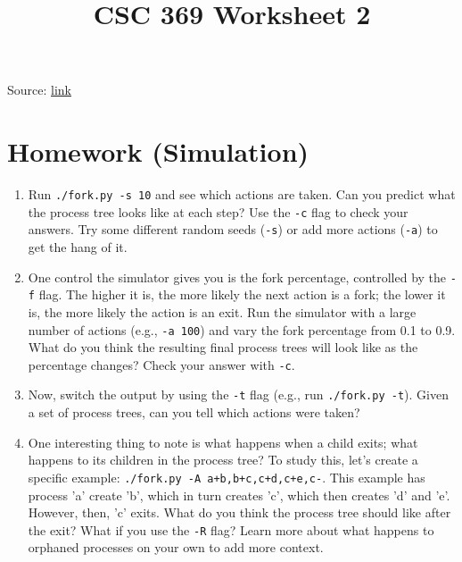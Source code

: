 \documentclass[12pt]{article}
\begin{document}
\title{CSC 369 Worksheet 2}
\maketitle

\bigskip

Source: \href{http://pages.cs.wisc.edu/~remzi/OSTEP/cpu-api.pdf}{link}

\bigskip

\section{Homework (Simulation)}

\bigskip

\begin{enumerate}[1.]
    \item Run \texttt{./fork.py -s 10} and see which actions are taken. Can you
    predict what the process tree looks like at each step? Use the \texttt{-c}
    flag to check your answers. Try some different random seeds (\texttt{-s})
    or add more actions (\texttt{-a}) to get the hang of it.

    \item One control the simulator gives you is the fork percentage, controlled by the \texttt{-f} flag. The higher it is, the more likely the next
    action is a fork; the lower it is, the more likely the action is an
    exit. Run the simulator with a large number of actions (e.g., \texttt{-a
    100}) and vary the fork percentage from 0.1 to 0.9. What do you
    think the resulting final process trees will look like as the percentage changes? Check your answer with \texttt{-c}.

    \item Now, switch the output by using the \texttt{-t} flag (e.g., run \texttt{./fork.py
    -t}). Given a set of process trees, can you tell which actions were
    taken?

    \item One interesting thing to note is what happens when a child exits;
    what happens to its children in the process tree? To study this, let’s
    create a specific example: \texttt{./fork.py -A a+b,b+c,c+d,c+e,c-}.
    This example has process ’a’ create ’b’, which in turn creates ’c’,
    which then creates ’d’ and ’e’. However, then, ’c’ exits. What do
    you think the process tree should like after the exit? What if you
    use the \texttt{-R} flag? Learn more about what happens to orphaned processes on your own to add more context.


\end{enumerate}
\end{document}
